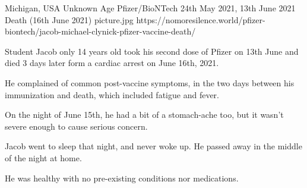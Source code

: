 {Michigan, USA}
{Unknown Age}
{Pfizer/BioNTech}
{24th May 2021, 13th June 2021}
{Death (16th June 2021)}
{picture.jpg}
{https://nomoresilence.world/pfizer-biontech/jacob-michael-clynick-pfizer-vaccine-death/}
{

Student Jacob only 14 years old took his second dose of Pfizer on 13th June and
died 3 days later form a cardiac arrest on June 16th, 2021.

He complained of common post-vaccine symptoms, in the two days between his
immunization and death, which included fatigue and fever.

On the night of June 15th, he had a bit of a stomach-ache too, but it wasn’t
severe enough to cause serious concern.

Jacob went to sleep that night, and never woke up. He passed away in the middle
of the night at home.

He was healthy with no pre-existing conditions nor medications.

}
